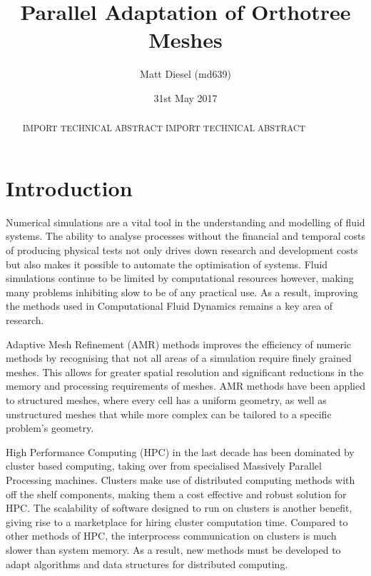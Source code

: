 \documentclass[twoside]{IIBproject}
\numberwithin{figure}{section}
\begin{document}
\date{31st May 2017}
\author{Matt Diesel (md639)}
\title{Parallel Adaptation of Orthotree Meshes}

\pagestyle{empty}
\maketitle

\thispagestyle{empty}
\renewcommand{\abstractname}{Technical Abstract}
\begin{abstract}
IMPORT TECHNICAL ABSTRACT
\newpage
IMPORT TECHNICAL ABSTRACT
\end{abstract}

\newpage
\setcounter{tocdepth}{2}
\tableofcontents
\newpage
\pagestyle{plain}


\section{Introduction} %
    \label{sec:intro}

    Numerical simulations are a vital tool in the understanding and modelling of fluid systems. The ability to analyse processes without the financial and temporal costs of producing physical tests not only drives down research and development costs but also makes it possible to automate the optimisation of systems. Fluid simulations continue to be limited by computational resources however, making many problems inhibiting slow to be of any practical use. As a result, improving the methods used in Computational Fluid Dynamics remains a key area of research.

    Adaptive Mesh Refinement (AMR) methods improves the efficiency of numeric methods by recognising that not all areas of a simulation require finely grained meshes. This allows for greater spatial resolution and significant reductions in the memory and processing requirements of meshes. AMR methods have been applied to structured meshes, where every cell has a uniform geometry, as well as unstructured meshes that while more complex can be tailored to a specific problem's geometry. 

    High Performance Computing (HPC) in the last decade has been dominated by cluster based computing, taking over from specialised Massively Parallel Processing machines. Clusters make use of distributed computing methods with off the shelf components, making them a cost effective and robust solution for HPC. The scalability of software designed to run on clusters is another benefit, giving rise to a marketplace for hiring cluster computation time. Compared to other methods of HPC, the interprocess communication on clusters is much slower than system memory. As a result, new methods must be developed to adapt algorithms and data structures for distributed computing.
\end{document}
